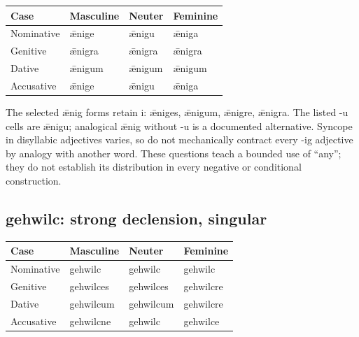 \par\begingroup
\fontsize{10.5}{13.2}\selectfont
\setlength{\LTleft}{0pt}\setlength{\LTright}{\fill}
\noindent
\begin{tabular}{@{}>{\raggedright\arraybackslash}p{28.89mm}>{\raggedright\arraybackslash}p{28.89mm}>{\raggedright\arraybackslash}p{28.89mm}>{\raggedright\arraybackslash}p{28.89mm}@{}}
\toprule
\textbf{Case} & \textbf{Masculine} & \textbf{Neuter} & \textbf{Feminine} \\
\midrule
Nominative & ǣnige & ǣnigu & ǣniga \\
Genitive & ǣnigra & ǣnigra & ǣnigra \\
Dative & ǣnigum & ǣnigum & ǣnigum \\
Accusative & ǣnige & ǣnigu & ǣniga \\
\bottomrule
\end{tabular}
\par\endgroup

The selected ǣnig forms retain i: ǣniges, ǣnigum, ǣnigre, ǣnigra. The listed -u cells are ǣnigu; analogical ǣnig without -u is a documented alternative. Syncope in disyllabic adjectives varies, so do not mechanically contract every -ig adjective by analogy with another word. These questions teach a bounded use of “any”; they do not establish its distribution in every negative or conditional construction.

\subsection*{gehwilc: strong declension, singular}

\par\begingroup
\fontsize{10.5}{13.2}\selectfont
\setlength{\LTleft}{0pt}\setlength{\LTright}{\fill}
\noindent
\begin{tabular}{@{}>{\raggedright\arraybackslash}p{28.89mm}>{\raggedright\arraybackslash}p{28.89mm}>{\raggedright\arraybackslash}p{28.89mm}>{\raggedright\arraybackslash}p{28.89mm}@{}}
\toprule
\textbf{Case} & \textbf{Masculine} & \textbf{Neuter} & \textbf{Feminine} \\
\midrule
Nominative & gehwilc & gehwilc & gehwilc \\
Genitive & gehwilces & gehwilces & gehwilcre \\
Dative & gehwilcum & gehwilcum & gehwilcre \\
Accusative & gehwilcne & gehwilc & gehwilce \\
\bottomrule
\end{tabular}
\par\endgroup

